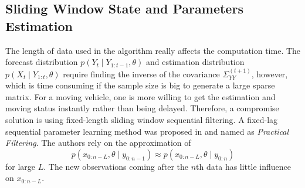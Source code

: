 %

\subsection{Sliding Window State and Parameters Estimation}

The length of data used in the algorithm really affects the computation time. The forecast distribution $p(Y_{t}\mid Y_{1:t-1},\theta)$ and estimation distribution $p(X_{t}\mid Y_{1:t},\theta)$ require finding the inverse of the covariance $\Sigma_{YY}^{(t+1)}$, however, which is time consuming if the sample size is big to generate a large sparse matrix. For a moving vehicle, one is more willing to get the estimation and moving status instantly rather than being delayed. Therefore, a compromise solution is using fixed-length sliding window sequential filtering. A fixed-lag sequential parameter learning method was proposed in \cite{polson2008practical} and named as \textit{Practical Filtering}. The authors rely on the approximation of 
\begin{equation*}
p(x_{0:n-L},\theta\mid y_{0:n-1}) \approx p(x_{0:n-L},\theta \mid y_{0:n})
\end{equation*}
for large $L$. The new observations coming after the $n$th data has little influence on $x_{0:n-L}$. 

